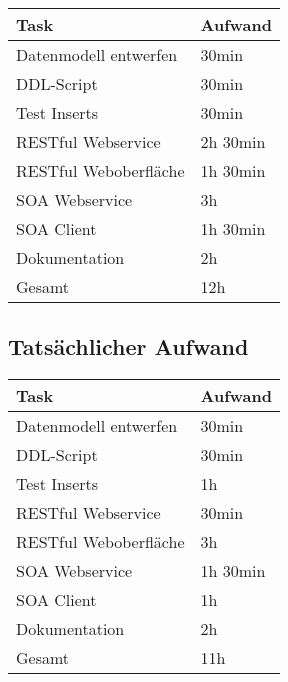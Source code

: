 \documentclass[11pt]{article}
\begin{document}
\begin{center}
  \begin{tabular}{| l | l |}
    \hline
    	Task & Aufwand  \\ \hline \hline
		Datenmodell entwerfen & 30min \\ \hline
		DDL-Script & 30min \\ \hline
    	Test Inserts  & 30min  \\ \hline 
		RESTful Webservice & 2h 30min \\ \hline 
    	RESTful Weboberfläche & 1h 30min \\ \hline 
    	SOA Webservice & 3h\\ \hline
		SOA Client & 1h 30min\\ \hline
		Dokumentation & 2h\\ \hline \hline
    	Gesamt & 12h \\ \hline
  \end{tabular}
\end{center}

\subsection{Tatsächlicher Aufwand}
\begin{center}
  \begin{tabular}{| l | l |}
        \hline
    	Task & Aufwand  \\ \hline \hline
		Datenmodell entwerfen & 30min \\ \hline
		DDL-Script & 30min \\ \hline
    	Test Inserts  & 1h  \\ \hline 
		RESTful Webservice & 30min \\ \hline 
    	RESTful Weboberfläche & 3h \\ \hline 
    	SOA Webservice & 1h 30min\\ \hline
		SOA Client & 1h\\ \hline
		Dokumentation & 2h\\ \hline \hline
    	Gesamt & 11h \\ \hline

  \end{tabular}
\end{center}
\end{document}
